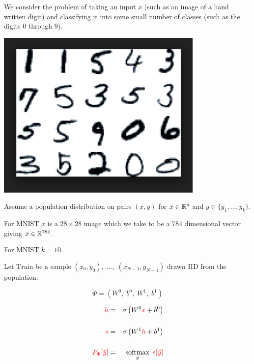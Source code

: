 {

We consider the problem of taking an input $x$ (such as an image of a hand written digit) and classifying it into some small number of classes (such as the digits $0$ through $9$).

\vfill
\centerline{\includegraphics[width= 4.0in]{../images/MNIST}}
  

Assume a population distribution on pairs $(x,y)$ for $x \in \mathbb{R}^d$ and $y \in \{y_1,\ldots, y_k\}$.

\vfill
For MNIST $x$ is a $28 \times 28$ image which we take to be a 784 dimensional vector giving $x \in \mathbb{R}^{784}$.

\vfill
For MNIST $k = 10$.

\vfill
Let $\mathrm{Train}$ be a sample $(x_0,y_0),\;\ldots,\;(x_{N-1},y_{N-1})$ drawn IID from the population.


$$\Phi = (W^0,\;b^0,\;W^1,\;b^1)$$

\begin{eqnarray*}
  {\color{red} h} & = & \sigma\left(W^0{\color{red} x} + b^0\right) \\
  \\
  {\color{red} s} & = & \sigma\left(W^1{\color{red} h} + b^1 \right) \\
  \\
  {\color{red} P_\Phi[\hat{y}]} & = & \operatorname*{softmax}_{\hat{y}}\;{\color{red} s[\hat{y}]}
\end{eqnarray*}


}
